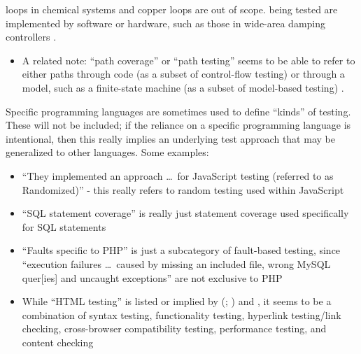 \begin{enumerate}
{                  loops in chemical systems \citep{Dominguez-PumarEtAl2020} and
                  copper loops \citep{Goralski1999} are out of scope.} being
            tested are implemented by software or hardware, such as those in
            wide-area damping controllers \citep{PierreEtAl2017, TrudnowskiEtAl2017}.
            \begin{itemize}
                  \item A related note: ``path coverage'' or ``path testing''
                        seems to be able to refer to either paths through code
                        (as a subset of control-flow testing)
                        \citep[p.~5-13]{SWEBOK2024} or through a model, such as
                        a finite-state machine (as a subset of model-based
                        testing) \citep[p.~184]{DoğanEtAl2014}.
            \end{itemize}
            \fi
\end{enumerate}

\ifnotpaper
      Specific programming languages are sometimes used to define ``kinds'' of
      testing. These will not be included; if the reliance
      on a specific programming language is intentional, then this really implies an
      underlying test approach that may be generalized to other languages. Some
      examples:

      \begin{itemize}
            \item ``They implemented an approach \dots\ for JavaScript testing
                  (referred to as Randomized)'' \citep[p.~192]{DoğanEtAl2014} -
                  this really refers to random testing used within JavaScript
            \item ``SQL statement coverage'' is really just statement coverage
                  used specifically for SQL statements \citep[Tab.~13]{DoğanEtAl2014}
            \item ``Faults specific to PHP'' is just a subcategory of fault-based
                  testing, since ``execution failures \dots\ caused by missing an
                  included file, wrong MySQL quer[ies] and uncaught exceptions''
                  are not exclusive to PHP \citep[Tab.~27]{DoğanEtAl2014}
            \item While ``HTML testing'' is listed or implied by
                  \citeauthor{Gerrard2000a} (\citeyear[Tab.~2]{Gerrard2000a};
                  \citeyear[Tab.~1, p.~3]{Gerrard2000b}) and
                  \citet[p.~220]{Patton2006}, it seems to be a combination of syntax
                  testing, functionality testing, hyperlink testing/link checking,
                  cross-browser compatibility testing, performance testing, and
                  content checking \citep[p.~3]{Gerrard2000b}
      \end{itemize}


